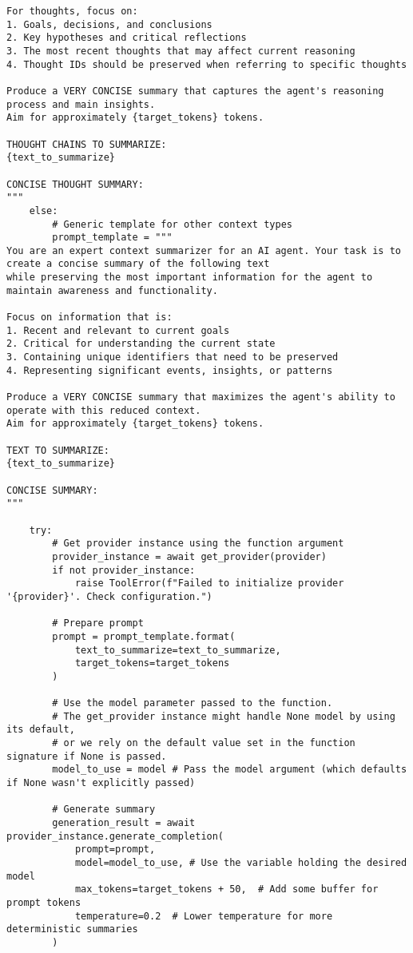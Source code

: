 \documentclass[12pt,a4paper]{article}
\begin{document}
\begin{pageablecode}
\begin{verbatim}
For thoughts, focus on:
1. Goals, decisions, and conclusions
2. Key hypotheses and critical reflections
3. The most recent thoughts that may affect current reasoning
4. Thought IDs should be preserved when referring to specific thoughts

Produce a VERY CONCISE summary that captures the agent's reasoning process and main insights.
Aim for approximately {target_tokens} tokens.

THOUGHT CHAINS TO SUMMARIZE:
{text_to_summarize}

CONCISE THOUGHT SUMMARY:
"""
    else:
        # Generic template for other context types
        prompt_template = """
You are an expert context summarizer for an AI agent. Your task is to create a concise summary of the following text
while preserving the most important information for the agent to maintain awareness and functionality.

Focus on information that is:
1. Recent and relevant to current goals
2. Critical for understanding the current state
3. Containing unique identifiers that need to be preserved
4. Representing significant events, insights, or patterns

Produce a VERY CONCISE summary that maximizes the agent's ability to operate with this reduced context.
Aim for approximately {target_tokens} tokens.

TEXT TO SUMMARIZE:
{text_to_summarize}

CONCISE SUMMARY:
"""

    try:
        # Get provider instance using the function argument
        provider_instance = await get_provider(provider)
        if not provider_instance:
            raise ToolError(f"Failed to initialize provider '{provider}'. Check configuration.")

        # Prepare prompt
        prompt = prompt_template.format(
            text_to_summarize=text_to_summarize,
            target_tokens=target_tokens
        )

        # Use the model parameter passed to the function.
        # The get_provider instance might handle None model by using its default,
        # or we rely on the default value set in the function signature if None is passed.
        model_to_use = model # Pass the model argument (which defaults if None wasn't explicitly passed)

        # Generate summary
        generation_result = await provider_instance.generate_completion(
            prompt=prompt,
            model=model_to_use, # Use the variable holding the desired model
            max_tokens=target_tokens + 50,  # Add some buffer for prompt tokens
            temperature=0.2  # Lower temperature for more deterministic summaries
        )


\end{verbatim}
\end{pageablecode}
\end{document}

